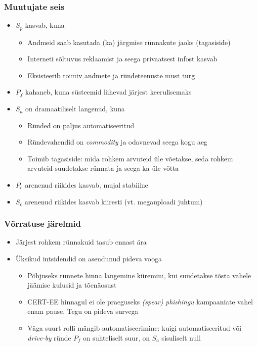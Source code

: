 \begin{frame}[fragile]
  \frametitle{Muutujate seis}
	\begin{itemize}
		\item $S_p$ kasvab, kuna 
			\begin{itemize}
				\item Andmeid saab kasutada (ka) järgmise rünnakute jaoks (tagasiside) 
				\item Interneti sõltuvus reklaamist ja seega privaatsest infost kasvab
				\item Eksisteerib toimiv andmete ja ründeteenuste must turg
			\end{itemize}
		\item $P_f$ kahaneb, kuna süsteemid lähevad järjest keerulisemaks
		\item $S_a$ on dramaatiliselt langenud, kuna 
			\begin{itemize}
				\item Ründed on paljus automatiseeritud
				\item Ründevahendid on \emph{commodity} ja odavnevad seega kogu aeg
				\item Toimib tagasiside: mida rohkem arvuteid üle võetakse, seda rohkem arvuteid suudetakse rünnata ja seega ka üle võtta
			\end{itemize}
		\item $P_c$ arenenud riikides kasvab, mujal stabiilne
		\item $S_c$ arenenud riikides kasvab kiiresti (vt. megauploadi juhtum)
	\end{itemize}
\end{frame}


\begin{frame}[fragile]
  \frametitle{Võrratuse järelmid}
  	\begin{itemize}
		\item Järjest rohkem rünnakuid tasub ennast ära
		\item Üksikud intsidendid on asendunud pideva vooga
	\begin{itemize}
		\item Põhjuseks rünnete hinna langemine kiiremini, kui suudetakse tõsta vahele jäämise kulusid ja tõenäosust
		\item CERT-EE hinnagul ei ole praeguseks \emph{(spear) phishingu} kampaaniate vahel enam pause. Tegu on pideva survega
		\item Väga suurt rolli mängib automatiseerimine: kuigi automatiseeritud või \emph{drive-by} ründe $P_f$ on suhteliselt suur, on $S_a$ sisuliselt null
	\end{itemize}
	\end{itemize}
\end{frame}

